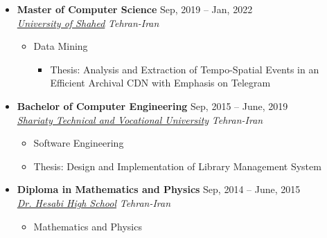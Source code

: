 \documentclass[10pt,a4paper,sans]{moderncv} %
\begin{document}
	\begin{itemize}
		\item \textbf{Master of Computer Science} \hfill Sep, 2019 -- Jan, 2022 \\ 
		\href{http://shahed.ac.ir/pages/home.aspx}{ \emph{University of Shahed}} \hfill \emph{Tehran-Iran}
		\begin{itemize}
			\item Data Mining \hspace{10 pt}  %
			\begin{itemize}
				\item Thesis: Analysis and Extraction of Tempo-Spatial Events in an Efficient Archival CDN
with Emphasis on Telegram
				\\
			\end{itemize}
		\end{itemize}
		\vspace{-1 em}
		\item \textbf{Bachelor of Computer Engineering} \hfill Sep, 2015 -- June, 2019 \\
		\href{https://www.shariaty.ac.ir/fa}{ \emph{Shariaty Technical and Vocational University}} \hfill \emph{Tehran-Iran}
		\begin{itemize}
			\begin{itemize}		
				\item Software Engineering \hspace{10 pt} 
				\item Thesis: Design and Implementation of Library Management System 
			\end{itemize}
		\end{itemize}

		\item \textbf{Diploma in Mathematics and Physics} \hfill Sep, 2014 -- June, 2015 \\ 
		\href{http://drhesabirey.ir/girls/hschool/#/Frontpage}{ \emph{Dr. Hesabi High School}} \hfill \emph{Tehran-Iran}
		\begin{itemize}
			\item Mathematics and Physics \hspace{10 pt}  %
			\begin{itemize}
				 \\
			\end{itemize}
		\end{itemize}
	\end{itemize}
	\iffalse
	
\end{document}
